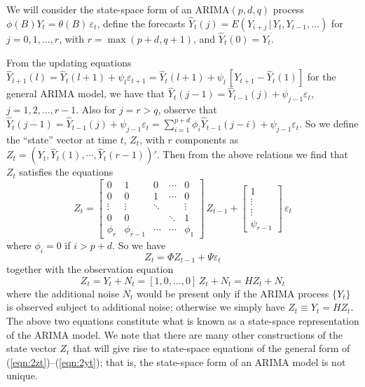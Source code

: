 We will consider the state-space form of an ARIMA$(p,d,q)$ process $\phi(B)Y_t = \theta(B)\,\varepsilon_t$, define the forecasts $\hat{Y}_t(j) = E(Y_{i+j}\,|\,Y_t,Y_{t-1},...)$ for $j= 0,1,\ldots,r$, with $r= \max(p+d,q+1)$, and $\hat{Y}_t(0) = Y_t$.


From the updating equations $\hat{Y}_{t+1}(l) = \hat{Y}_t(l+1) + \psi_l\varepsilon_{t+1}= \hat{Y}_t(l + 1) + \psi_l\, [Y_{t+1} - \hat{Y}_t(1)]$ for the general ARIMA model, we have that $\hat{Y}_t(j - 1)= \hat{Y}_{t-1}(j) + \psi_{j-1}\varepsilon_t$, $j = 1,2,\ldots,r-1$. Also for $j= r>q$, observe that $\hat{Y}_t(j-1)= \hat{Y}_{t-1}(j) + \psi_{j-1}\varepsilon_t = \sum_{i=1}^{p+d}\phi_i\hat{Y}_{t-1}(j - i) + \psi_{j-1}\varepsilon_t$. So we define the ``state'' vector at time $t$, $Z_t$, with $r$ components as $Z_t = (Y_t, \hat{Y}_t(1),\cdots,\hat{Y}_t(r-1))'$. Then from the above relations we find that $Z_t$ satisfies the equations
	\[ 
	Z_t = \begin{bmatrix}
                        0 & 1 & 0 & \cdots & 0 \\
                        0 & 0 & 1 & \cdots &  0 \\
                        \vdots & \vdots &\ddots  &  &  \vdots \\
                        0 & 0 &  & \ddots &  1 \\
                        \phi_r & \phi_{r-1} & \cdots & \cdots &  \phi_1
                    \end{bmatrix}
                    \,Z_{t-1} + 
                    \begin{bmatrix}
                    1\\ \vdots \\ \vdots \\ \psi_{r-1}
                    \end{bmatrix}
                    \,\varepsilon_t
                    \]
where $\phi_i = 0$ if $i > p + d$. So we have
	\begin{equation}\label{eqn:2secondzt}
	Z_t = \Phi Z_{t-1} + \Psi\varepsilon_t
	\end{equation}
together with the observation equation
	\begin{equation}\label{eqn:2thirdzt}
	Z_t = Y_t + N_t = [1,0,\ldots,0] \,Z_t + N_t = H Z_t + N_t
	\end{equation}
where the additional noise $N_t$ would be present only if the ARIMA process $\{Y_t\}$ is observed subject to additional noise; otherwise we simply have $Z_t \equiv Y_t = HZ_t$. The above two equations constitute what is known as a state-space representation of the ARIMA model. We note that there are many other constructions of the state vector $Z_t$ that will give rise to state-space equations of the general form of (\ref{eqn:2zt})--(\ref{eqn:2yt}); that is, the state-space form of an ARIMA model is not unique.

